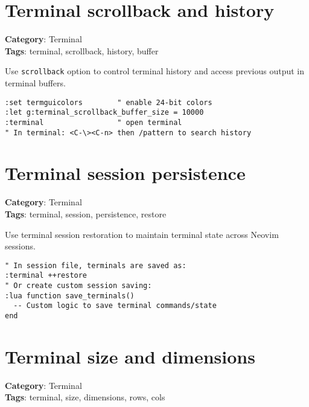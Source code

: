 {{{{{{{{{{\section{Terminal scrollback and history}

\textbf{Category}: Terminal\\ \textbf{Tags}: terminal, scrollback, history, buffer
\vspace{0.5cm}

Use {\footnotesize \Verb§scrollback§} option to control terminal history and access previous output in terminal buffers.

\begin{Exa*}{}
\begin{Verbatim}[fontsize=\footnotesize, breaklines, breakanywhere]
:set termguicolors        " enable 24-bit colors
:let g:terminal_scrollback_buffer_size = 10000
:terminal                 " open terminal
" In terminal: <C-\><C-n> then /pattern to search history
\end{Verbatim}
\end{Exa*}

\section{Terminal session persistence}

\textbf{Category}: Terminal\\ \textbf{Tags}: terminal, session, persistence, restore
\vspace{0.5cm}

Use terminal session restoration to maintain terminal state across Neovim sessions.

\begin{Exa*}{}
\begin{Verbatim}[fontsize=\footnotesize, breaklines, breakanywhere]
" In session file, terminals are saved as:
:terminal ++restore
" Or create custom session saving:
:lua function save_terminals()
  -- Custom logic to save terminal commands/state
end
\end{Verbatim}
\end{Exa*}

\section{Terminal size and dimensions}

\textbf{Category}: Terminal\\ \textbf{Tags}: terminal, size, dimensions, rows, cols
\vspace{0.5cm}

}}}}}}}}}}
